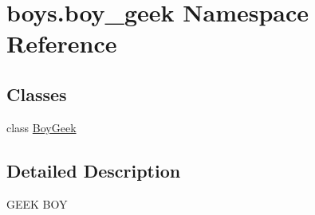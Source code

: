 \hypertarget{namespaceboys_1_1boy__geek}{}\section{boys.\+boy\+\_\+geek Namespace Reference}
\label{namespaceboys_1_1boy__geek}
\subsection*{Classes}
\begin{DoxyCompactItemize}
\item 
class \hyperlink{classboys_1_1boy__geek_1_1_boy_geek}{Boy\+Geek}
\end{DoxyCompactItemize}


\subsection{Detailed Description}
\begin{DoxyVerb}GEEK BOY\end{DoxyVerb}
 